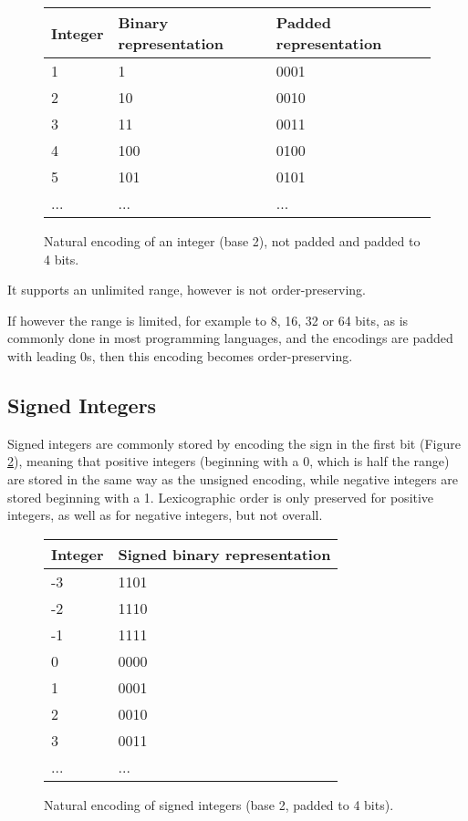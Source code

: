 \documentclass{acm_proc_article-sp}
\begin{document}
\begin{figure}[p]
\caption{Natural encoding of an integer (base 2), not padded and padded to 4 bits.}
\label{figure-natural-encoding}
\center
\begin{tabular}{|l|l|l|}
\hline
Integer & Binary representation & Padded representation \\
\hline
1 & 1 & 0001 \\
\hline
2 & 10 & 0010 \\
\hline
3 & 11 & 0011\\
\hline
4 & 100  & 0100 \\
\hline
5 & 101  & 0101\\
\hline
... & ... & ... \\
\hline
\end{tabular}
\end{figure}

It supports an unlimited range, however is not order-preser\-ving.

If however the range is limited, for example to 8, 16, 32 or 64 bits, as is commonly done in most programming languages, and the encodings are padded with leading 0s, then this encoding becomes order-preserving.

\subsection{Signed Integers}

Signed integers are commonly stored by encoding the sign in the first bit (Figure \ref{figure-natural-signed-encoding}), meaning that positive integers (beginning with a 0, which is half the range) are stored in the same way as the unsigned encoding, while negative integers are stored beginning with a 1. Lexicographic order is only preserved for positive integers, as well as for negative integers, but not overall.

\begin{figure}[p]
\caption{Natural encoding of signed integers (base 2, padded to 4 bits).}
\label{figure-natural-signed-encoding}
\center
\begin{tabular}{|l|l|}
\hline
Integer & Signed binary representation \\
\hline
-3 & 1101 \\
\hline
-2 & 1110 \\
\hline
-1 & 1111 \\
\hline
0 & 0000 \\
\hline
1 & 0001 \\
\hline
2 & 0010 \\
\hline
3 & 0011 \\
\hline
... & ... \\
\hline
\end{tabular}
\end{figure}
\end{document}
